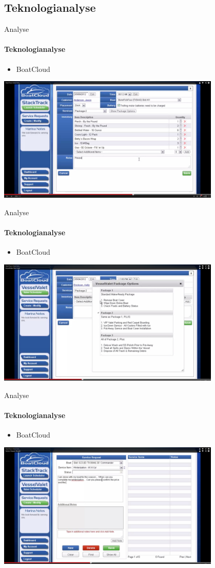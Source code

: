 \subsection{Teknologianalyse}


\begin{frame}{Analyse}
\framesubtitle{Teknologianalyse}
  \begin{itemize}
    \item BoatCloud
  \end{itemize}
        \includegraphics[width=0.8\textwidth]{images/StackTrack.jpg}
\end{frame}

\begin{frame}{Analyse}
\framesubtitle{Teknologianalyse}
  \begin{itemize}
    \item BoatCloud
  \end{itemize}
        \includegraphics[width=0.8\textwidth]{images/VesselValet.jpg}  
\end{frame}

\begin{frame}{Analyse}
\framesubtitle{Teknologianalyse}
  \begin{itemize}
    \item BoatCloud
  \end{itemize}
        \includegraphics[width=0.8\textwidth]{images/TicketTracker.jpg} 
\end{frame}

